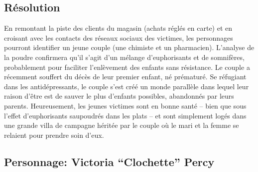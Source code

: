 \subsection{Résolution}

En remontant la piste des clients du magasin (achats réglés en carte) et en croisant avec les contacts des réseaux sociaux des victimes, les personnages pourront identifier un jeune couple (une chimiste et un pharmacien).
L'analyse de la poudre confirmera qu'il s'agit d'un mélange d'euphorisants et de somnifères, probablement pour faciliter l'enlèvement des enfants sans résistance.
Le couple a récemment souffert du décès de leur premier enfant, né prématuré.
Se réfugiant dans les antidépressants, le couple s'est créé un monde parallèle dans lequel leur raison d'être est de sauver le plus d'enfants possibles, \og abandonnés \fg par leurs parents.
Heureusement, les jeunes victimes sont en bonne santé -- bien que sous l'effet d'euphorisants saupoudrés dans les plats -- et sont simplement logés dans une grande villa de campagne héritée par le couple où le mari et la femme se relaient pour prendre soin d'eux.

\subsection{Personnage: Victoria ``Clochette'' Percy}

